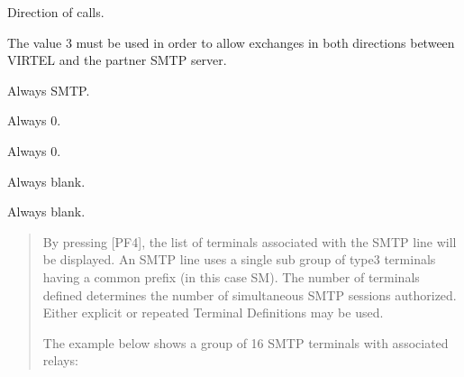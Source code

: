 \documentclass[letterpaper,10pt,english]{sphinxmanual}
\begin{document}
\begin{description}
\sphinxAtStartPar
Direction of calls.

\sphinxAtStartPar
The value 3 must be used in order to allow exchanges in both directions between VIRTEL and the partner SMTP server.

\sphinxAtStartPar
Always SMTP.

\sphinxAtStartPar
Always 0.

\sphinxAtStartPar
Always 0.

\sphinxAtStartPar
Always blank.

\sphinxAtStartPar
Always blank.

\end{description}

\sphinxAtStartPar
{}
\begin{quote}

\sphinxAtStartPar
By pressing {[}PF4{]}, the list of terminals associated with the SMTP line will be displayed. An SMTP line uses a single sub\sphinxhyphen{} group of type\sphinxhyphen{}3 terminals having a common prefix (in this case SM). The number of terminals defined determines the number of simultaneous SMTP sessions authorized. Either explicit or repeated Terminal Definitions may be used.

\sphinxAtStartPar
The example below shows a group of 16 SMTP terminals with associated relays:
\end{quote}

\sphinxAtStartPar
{}

\ignorespaces 
\end{document}
